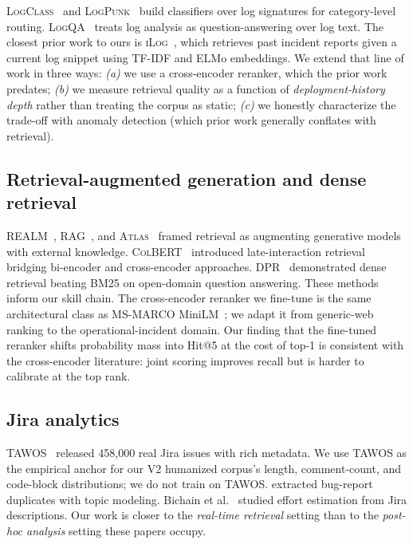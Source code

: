 \textsc{LogClass}~\cite{meng2020logclass} and \textsc{LogPunk}~\cite{liu2022logpunk} build classifiers over log signatures for category-level routing. \textsc{LogQA}~\cite{wang2023logqa} treats log analysis as question-answering over log text. The closest prior work to ours is \textsc{iLog}~\cite{jin2022ilog}, which retrieves past incident reports given a current log snippet using TF-IDF and ELMo embeddings. We extend that line of work in three ways: \emph{(a)} we use a cross-encoder reranker, which the prior work predates; \emph{(b)} we measure retrieval quality as a function of \emph{deployment-history depth} rather than treating the corpus as static; \emph{(c)} we honestly characterize the trade-off with anomaly detection (which prior work generally conflates with retrieval).

\subsection{Retrieval-augmented generation and dense retrieval}

\textsc{REALM}~\cite{guu2020realm}, \textsc{RAG}~\cite{lewis2020rag}, and \textsc{Atlas}~\cite{izacard2022atlas} framed retrieval as augmenting generative models with external knowledge. \textsc{ColBERT}~\cite{khattab2020colbert} introduced late-interaction retrieval bridging bi-encoder and cross-encoder approaches. \textsc{DPR}~\cite{karpukhin2020dpr} demonstrated dense retrieval beating BM25 on open-domain question answering. These methods inform our skill chain. The cross-encoder reranker we fine-tune is the same architectural class as MS-MARCO MiniLM~\cite{wang2020minilm}; we adapt it from generic-web ranking to the operational-incident domain. Our finding that the fine-tuned reranker shifts probability mass into Hit@5 at the cost of top-1 is consistent with the cross-encoder literature: joint scoring improves recall but is harder to calibrate at the top rank.

\subsection{Jira analytics}

\textsc{TAWOS}~\cite{tawosi2023tawos} released 458{,}000 real Jira issues with rich metadata. We use \textsc{TAWOS} as the empirical anchor for our V2 humanized corpus's length, comment-count, and code-block distributions; we do not train on \textsc{TAWOS}. \citet{diamantopoulos2018jira} extracted bug-report duplicates with topic modeling. Bichain et al.~\cite{bichain2023effortest} studied effort estimation from Jira descriptions. Our work is closer to the \emph{real-time retrieval} setting than to the \emph{post-hoc analysis} setting these papers occupy.

